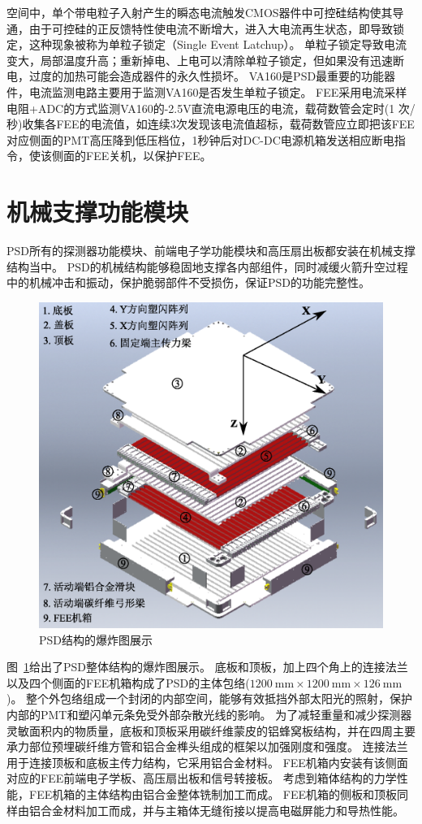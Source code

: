 空间中，单个带电粒子入射产生的瞬态电流触发CMOS器件中可控硅结构使其导通，由于可控硅的正反馈特性使电流不断增大，进入大电流再生状态，即导致锁定，这种现象被称为单粒子锁定（Single Event Latchup）。
单粒子锁定导致电流变大，局部温度升高；重新掉电、上电可以清除单粒子锁定，但如果没有迅速断电，过度的加热可能会造成器件的永久性损坏。
VA160是PSD最重要的功能器件，电流监测电路主要用于监测VA160是否发生单粒子锁定。
FEE采用电流采样电阻+ADC的方式监测VA160的-2.5V直流电源电压的电流，载荷数管会定时(1 次/秒)收集各FEE的电流值，如连续3次发现该电流值超标，载荷数管应立即把该FEE对应侧面的PMT高压降到低压档位，1秒钟后对DC-DC电源机箱发送相应断电指令，使该侧面的FEE关机，以保护FEE。


\section{机械支撑功能模块}
\label{sec:psd_support}
PSD所有的探测器功能模块、前端电子学功能模块和高压扇出板都安装在机械支撑结构当中。
PSD的机械结构能够稳固地支撑各内部组件，同时减缓火箭升空过程中的机械冲击和振动，保护脆弱部件不受损伤，保证PSD的功能完整性。

\begin{figure}[h!]
	\centering
	\includegraphics[width=0.8\linewidth]{chap/description/fig/psd_explosion.eps}
	\caption{PSD结构的爆炸图展示}
	\label{fig:ch2:psd_structure}
\end{figure}

图~\ref*{fig:ch2:psd_structure}给出了PSD整体结构的爆炸图展示。
底板和顶板，加上四个角上的连接法兰以及四个侧面的FEE机箱构成了PSD的主体包络($\SI{1200}{\milli\meter}\times\SI{1200}{\milli\meter}\times\SI{126}{\milli\meter}$)。
整个外包络组成一个封闭的内部空间，能够有效抵挡外部太阳光的照射，保护内部的PMT和塑闪单元条免受外部杂散光线的影响。
为了减轻重量和减少探测器灵敏面积内的物质量，底板和顶板采用碳纤维蒙皮的铝蜂窝板结构，并在四周主要承力部位预埋碳纤维方管和铝合金榫头组成的框架以加强刚度和强度。
连接法兰用于连接顶板和底板主传力结构，它采用铝合金材料。
FEE机箱内安装有该侧面对应的FEE前端电子学板、高压扇出板和信号转接板。
考虑到箱体结构的力学性能，FEE机箱的主体结构由铝合金整体铣制加工而成。
FEE机箱的侧板和顶板同样由铝合金材料加工而成，并与主箱体无缝衔接以提高电磁屏能力和导热性能。

